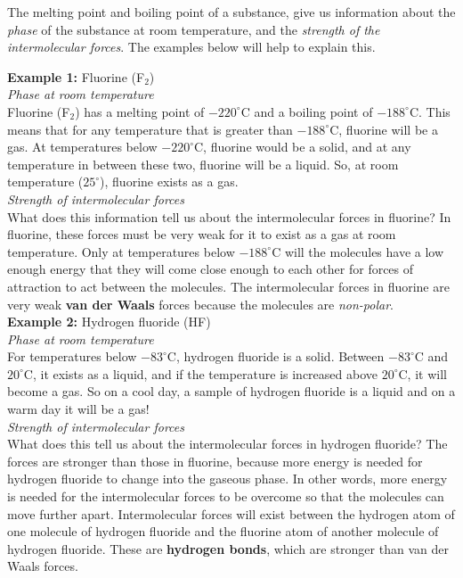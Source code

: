 The melting point and boiling point of a substance, give us information about the \textit{phase} of the substance at room temperature, and the \textit{strength of the intermolecular forces}. The examples below will help to explain this.

\textbf{Example 1:} Fluorine (F$_{2}$)\\

\textit{Phase at room temperature}\\

Fluorine (F$_{2}$) has a melting point of $-220^{\circ}$C and a boiling point of $-188^{\circ}$C. This means that for any temperature that is greater than $-188^{\circ}$C, fluorine will be a gas. At temperatures below $-220^{\circ}$C, fluorine would be a solid, and at any temperature in between these two, fluorine will be a liquid. So, at room temperature ($25^{\circ}$), fluorine exists as a gas.\\

\textit{Strength of intermolecular forces}\\

What does this information tell us about the intermolecular forces in fluorine? In fluorine, these forces must be very weak for it to exist as a gas at room temperature. Only at temperatures below $-188^{\circ}$C will the molecules have a low enough energy that they will come close enough to each other for forces of attraction to act between the molecules. The intermolecular forces in fluorine are very weak \textbf{van der Waals} forces because the molecules are \textit{non-polar}.\\

\textbf{Example 2:} Hydrogen fluoride (HF)\\

\textit{Phase at room temperature}\\

For temperatures below $-83^{\circ}$C, hydrogen fluoride is a solid. Between $-83^{\circ}$C and $20^{\circ}$C, it exists as a liquid, and if the temperature is increased above $20^{\circ}$C, it will become a gas. So on a cool day, a sample of hydrogen fluoride is a liquid and on a warm day it will be a gas!\\

\textit{Strength of intermolecular forces}\\

What does this tell us about the intermolecular forces in hydrogen fluoride? The forces are stronger than those in fluorine, because more energy is needed for hydrogen fluoride to change into the gaseous phase. In other words, more energy is needed for the intermolecular forces to be overcome so that the molecules can move further apart. Intermolecular forces will exist between the hydrogen atom of one molecule of hydrogen fluoride and the fluorine atom of another molecule of hydrogen fluoride. These are \textbf{hydrogen bonds}, which are stronger than van der Waals forces.\\

